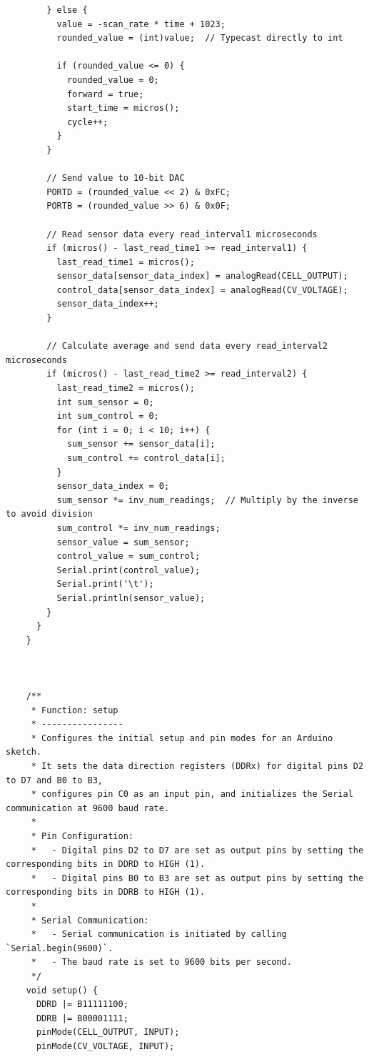 \documentclass{article}
\begin{document}
\begin{lstlisting}
        } else {
          value = -scan_rate * time + 1023;
          rounded_value = (int)value;  // Typecast directly to int
    
          if (rounded_value <= 0) {
            rounded_value = 0;
            forward = true;
            start_time = micros();
            cycle++;
          }
        }
    
        // Send value to 10-bit DAC
        PORTD = (rounded_value << 2) & 0xFC;
        PORTB = (rounded_value >> 6) & 0x0F;
    
        // Read sensor data every read_interval1 microseconds
        if (micros() - last_read_time1 >= read_interval1) {
          last_read_time1 = micros();
          sensor_data[sensor_data_index] = analogRead(CELL_OUTPUT);
          control_data[sensor_data_index] = analogRead(CV_VOLTAGE);
          sensor_data_index++;
        }
    
        // Calculate average and send data every read_interval2 microseconds
        if (micros() - last_read_time2 >= read_interval2) {
          last_read_time2 = micros();
          int sum_sensor = 0;
          int sum_control = 0;
          for (int i = 0; i < 10; i++) {
            sum_sensor += sensor_data[i];
            sum_control += control_data[i];
          }
          sensor_data_index = 0;
          sum_sensor *= inv_num_readings;  // Multiply by the inverse to avoid division
          sum_control *= inv_num_readings; 
          sensor_value = sum_sensor;
          control_value = sum_control;
          Serial.print(control_value);
          Serial.print('\t');
          Serial.println(sensor_value);
        }
      }
    }
    
    
    
    /**
     * Function: setup
     * ----------------
     * Configures the initial setup and pin modes for an Arduino sketch.
     * It sets the data direction registers (DDRx) for digital pins D2 to D7 and B0 to B3,
     * configures pin C0 as an input pin, and initializes the Serial communication at 9600 baud rate.
     *
     * Pin Configuration:
     *   - Digital pins D2 to D7 are set as output pins by setting the corresponding bits in DDRD to HIGH (1).
     *   - Digital pins B0 to B3 are set as output pins by setting the corresponding bits in DDRB to HIGH (1).
     *
     * Serial Communication:
     *   - Serial communication is initiated by calling `Serial.begin(9600)`.
     *   - The baud rate is set to 9600 bits per second.
     */
    void setup() {
      DDRD |= B11111100;
      DDRB |= B00001111;
      pinMode(CELL_OUTPUT, INPUT);
      pinMode(CV_VOLTAGE, INPUT);
    

\end{lstlisting}
\end{document}
